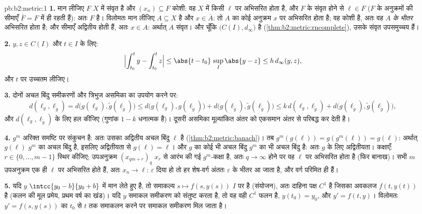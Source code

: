 \begin{solution}{pb:b2:metric:1}
\textbf{1.} मान लीजिए $F$  $X$ में संवृत है और $(x_n)
\subseteq F$ कोशी: वह $X$
में किसी $\ell$ पर अभिसरित होता है, और $F$ के संवृत होने से $\ell \in F$ ($F$ के
अनुक्रमों की सीमाएँ $\overline F = F$ में ही रहती हैं): अतः $F$  है। विलोमतः मान
लीजिए $A
\subseteq X$  है और $x \in \overline A$: तो $A$ का कोई अनुक्रम $x$ पर अभिसरित
होता है; वह कोशी है, अतः वह $A$ \emph{के भीतर} अभिसरित होता है; और
सीमाएँ अद्वितीय होती हैं, अतः $x \in A$: अर्थात् $A$ संवृत। और चूँकि $\bigl(C(I), d_\infty\bigr)$
 है (\cref{thm:b2:metric:rncomplete}), उसके संवृत उपसमुच्चय  हैं।

\textbf{2.} $y, z \in C(I)$ और $t \in I$ के लिए:
\[
\Bigl|\int_{t_0}^{t}y - \int_{t_0}^{t}z\Bigr| \leq
\abs{t - t_0}\,\sup_I\abs{y - z} \leq h\,d_\infty(y, z),
\]
और $t$ पर उच्चतम लीजिए।

\textbf{3.} दोनों अचल बिंदु समीकरणों और त्रिभुज असमिका का उपयोग करने पर:
\[
d(\ell_g, \ell_{\widetilde g})
= d\bigl(g(\ell_g), \widetilde g(\ell_{\widetilde g})\bigr)
\leq d\bigl(g(\ell_g), g(\ell_{\widetilde g})\bigr) +
d\bigl(g(\ell_{\widetilde g}), \widetilde g(\ell_{\widetilde
g})\bigr)
\leq k\,d(\ell_g, \ell_{\widetilde g}) +
d\bigl(g(\ell_{\widetilde g}), \widetilde g(\ell_{\widetilde
g})\bigr),
\]
और $d(\ell_g, \ell_{\widetilde g})$ के लिए हल कीजिए (गुणांक $1 - k$ धनात्मक है)। दूसरी असमिका
मूल्यांकित अंतर को एकसमान अंतर से परिबद्ध कर देती है।

\textbf{4.} $g^m$ अरिक्त  समष्टि पर संकुचन है: अतः उसका अद्वितीय अचल
बिंदु $\ell$ है (\cref{thm:b2:metric:banach})। तब $g^m(g(\ell)) =
g(g^m(\ell)) = g(\ell)$: अर्थात् $g(\ell)$ $g^m$ का अचल बिंदु है, इसलिए
अद्वितीयता से $g(\ell) = \ell$। और $g$ का कोई भी अचल बिंदु $g^m$ का भी अचल बिंदु है:
अतः $g$ के लिए अद्वितीयता। कक्षाएँ: $r \in \{0, \dots,
m-1\}$ स्थिर कीजिए; उपअनुक्रम $(x_{qm + r})_q$
$x_r$ से आरंभ की गई $g^m$-कक्षा है, अतः $q \to \infty$ होने पर वह $\ell$ पर अभिसरित
होता है (फिर बानाख)। सभी $m$ उपअनुक्रम एक ही $\ell$ पर अभिसरित होते हैं,
अतः $x_n \to \ell$: $\varepsilon$ दिया हो तो हर शेष-वर्ग अंततः $\varepsilon$ के भीतर आ जाता है, और
वर्ग परिमित ही हैं।

\textbf{5.} यदि $y$ $\intcc{y_0 -
b}{y_0 + b}$ में मान लेते हुए  है, तो समाकल्य $s \mapsto f(s, y(s))$ $I$
पर  है (संयोजन), अतः दाहिना पक्ष $C^1$ है जिसका अवकलज $f(t, y(t))$ है (कलन की
मूल प्रमेय, प्रथम वर्ष का खंड)। यदि $y$ समाकल समीकरण को संतुष्ट करता
है, तो वह वही $C^1$ फलन है, $y(t_0) = y_0$, और $y' = f(t, y)$। विलोमतः $y' = f(s, y(s))$ का $t_0$ से $t$
तक समाकलन करने पर समाकल समीकरण मिल जाता है।


\end{solution}
